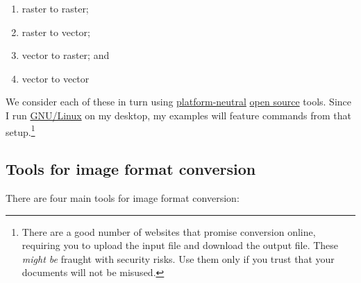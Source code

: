 \documentclass[
  11pt,
  british,
  a4paper,
]{article}
\providecommand{\tightlist}{%
  \setlength{\itemsep}{0pt}\setlength{\parskip}{0pt}}
\begin{document}
\begin{enumerate}
\def\labelenumi{\alph{enumi}.}
\tightlist
\item
  raster to raster;
\item
  raster to vector;
\item
  vector to raster; and
\item
  vector to vector
\end{enumerate}

We consider each of these in turn using
\href{https://itlaw.wikia.org/wiki/Platform_neutral}{platform-neutral}
\href{https://opensource.com/resources/what-open-source}{open source}
tools. Since I run
\href{https://en.wikipedia.org/wiki/GNU/Linux_naming_controversy}{GNU/Linux}
on my desktop, my examples will feature commands from that
setup.\footnote{There are a good number of websites that promise
  conversion online, requiring you to upload the input file and download
  the output file. These \emph{might be} fraught with security risks.
  Use them only if you trust that your documents will not be misused.}

\hypertarget{tools-for-image-format-conversion}{%
\subsection{Tools for image format
conversion}\label{tools-for-image-format-conversion}}

There are four main tools for image format conversion:
\end{document}
